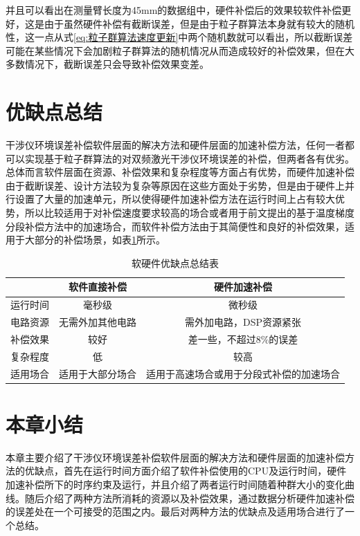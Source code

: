 并且可以看出在测量臂长度为45mm的数据组中，硬件补偿后的效果较软件补偿更好，这是由于虽然硬件补偿有截断误差，但是由于粒子群算法本身就有较大的随机性，这一点从式\eqref{eq:粒子群算法速度更新}中两个随机数就可以看出，所以截断误差可能在某些情况下会加剧粒子群算法的随机情况从而造成较好的补偿效果，但在大多数情况下，截断误差只会导致补偿效果变差。

\section{优缺点总结}
干涉仪环境误差补偿软件层面的解决方法和硬件层面的加速补偿方法，任何一者都可以实现基于粒子群算法的对双频激光干涉仪环境误差的补偿，但两者各有优劣。总体而言软件层面在资源、补偿效果和复杂程度等方面占有优势，而硬件加速补偿由于截断误差、设计方法较为复杂等原因在这些方面处于劣势，但是由于硬件上并行设置了大量的加速单元，所以使得硬件加速补偿方法在运行时间上占有较大优势，所以比较适用于对补偿速度要求较高的场合或者用于前文提出的基于温度梯度分段补偿方法中的加速场合，而软件补偿方法由于其简便性和良好的补偿效果，适用于大部分的补偿场景，如表\ref{tab:软硬件优缺点总结表}所示。
\begin{table}[H]
  \centering
  \caption{软硬件优缺点总结表}
  \label{tab:软硬件优缺点总结表}
  \begin{tabular}{c|c|c}
      \hline
                                    & 软件直接补偿        & 硬件加速补偿                  \\ \hline
      运行时间                       & 毫秒级             & 微秒级                        \\ \hline
      电路资源                       & 无需外加其他电路    & 需外加电路，DSP资源紧张        \\ \hline
      补偿效果                       & 较好               & 差一些，不超过8$\%$的误差     \\ \hline
      复杂程度                       & 低                 & 较高                          \\ \hline
      适用场合                       & 适用于大部分场合    & 适用于高速场合或用于分段式补偿的加速场合 \\ \hline
  \end{tabular}
\end{table}

\section{本章小结}
本章主要介绍了干涉仪环境误差补偿软件层面的解决方法和硬件层面的加速补偿方法的优缺点，首先在运行时间方面介绍了软件补偿使用的CPU及运行时间，硬件加速补偿所下的时序约束及运行，并且介绍了两者运行时间随着种群大小的变化曲线。随后介绍了两种方法所消耗的资源以及补偿效果，通过数据分析硬件加速补偿的误差处在一个可接受的范围之内。最后对两种方法的优缺点及适用场合进行了一个总结。